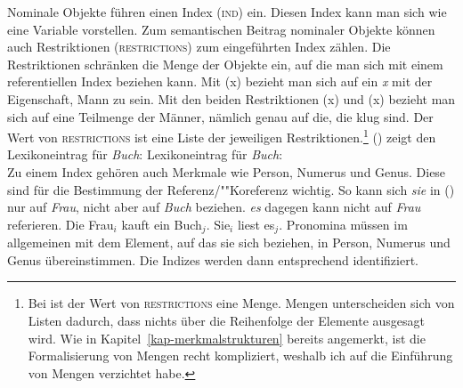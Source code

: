 Nominale Objekte führen einen Index (\textsc{ind}) ein. Diesen Index kann man
sich wie eine Variable vorstellen. Zum semantischen Beitrag nominaler Objekte
können auch Restriktionen (\textsc{restrictions}) zum eingeführten Index zählen.
Die Restriktionen schränken die Menge der Objekte ein, auf die man sich mit einem referentiellen
Index beziehen kann. Mit (x) bezieht man sich auf ein \emph{x} mit der
Eigenschaft, Mann zu sein. Mit den beiden Restriktionen (x) und (x)
bezieht man sich auf eine Teilmenge der Männer, nämlich genau auf die, die klug sind.
Der Wert von \textsc{restrictions} ist eine Liste der jeweiligen Restriktionen.\footnote{
  Bei \citet[]{ps2} ist der Wert von \textsc{restrictions} eine Menge.
  Mengen unterscheiden sich von Listen dadurch, dass nichts über die Reihenfolge 
  der Elemente ausgesagt wird. Wie in Kapitel~\ref{kap-merkmalstrukturen} bereits angemerkt, ist die
  Formalisierung von Mengen recht kompliziert, weshalb ich auf die Einführung von Mengen verzichtet habe.%
}
() zeigt den Lexikoneintrag für \emph{Buch}:
\ea
\label{le-buch}
Lexikoneintrag für \textit{Buch\/}:\\
\z
Zu einem Index gehören auch Merkmale wie Person, Numerus und Genus.
Diese sind für die Bestimmung der Referenz/""Koreferenz wichtig. So kann
sich \emph{sie} in () nur auf \emph{Frau}, nicht aber auf \emph{Buch}
beziehen. \emph{es} dagegen kann nicht auf \emph{Frau} referieren.
\ea
Die Frau$_i$ kauft ein Buch$_j$. Sie$_i$ liest es$_j$.
\z
Pronomina müssen im allgemeinen mit dem Element, auf das sie sich beziehen, in Person,
Numerus und Genus übereinstimmen. Die Indizes werden dann entsprechend identifiziert.
